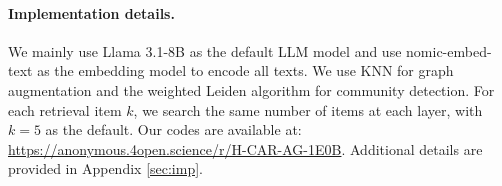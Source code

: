 \paragraph{Implementation details.}
We mainly use Llama 3.1-8B \cite{dubey2024llama} as the default LLM model and use nomic-embed-text \cite{nussbaum2024nomic} as the embedding model to encode all texts.
% 
We use KNN for graph augmentation and the weighted Leiden algorithm for community detection.
% 
For each retrieval item $k$, we search the same number of items at each layer, with $k=5$ as the default. Our codes are available at: \href{https://anonymous.4open.science/r/H-CAR-AG-1E0B}{https://anonymous.4open.science/r/H-CAR-AG-1E0B}.
% 
Additional details are provided in Appendix \ref{sec:imp}.